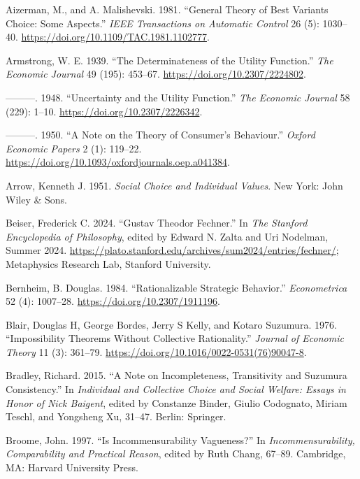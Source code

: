\documentclass[
  10.5pt,
  twoside]{article}
\newlength{\cslhangindent}
\newenvironment{CSLReferences}[2] %
 {\begin{list}{}{%
  \setlength{\itemindent}{0pt}
  \setlength{\leftmargin}{0pt}
  \setlength{\parsep}{0pt}
  \ifodd #1
   \setlength{\leftmargin}{\cslhangindent}
   \setlength{\itemindent}{-1\cslhangindent}
  \fi
  \setlength{\itemsep}{#2\baselineskip}}}
 {\end{list}}
\begin{document}
\label{refs}
\begin{CSLReferences}{1}{0}
Aizerman, M., and A. Malishevski. 1981. {``General Theory of Best
Variants Choice: Some Aspects.''} \emph{IEEE Transactions on Automatic
Control} 26 (5): 1030--40.
\url{https://doi.org/10.1109/TAC.1981.1102777}.

Armstrong, W. E. 1939. {``The Determinateness of the Utility
Function.''} \emph{The Economic Journal} 49 (195): 453--67.
\url{https://doi.org/10.2307/2224802}.

---------. 1948. {``Uncertainty and the Utility Function.''} \emph{The
Economic Journal} 58 (229): 1--10.
\url{https://doi.org/10.2307/2226342}.

---------. 1950. {``A Note on the Theory of Consumer's Behaviour.''}
\emph{Oxford Economic Papers} 2 (1): 119--22.
\url{https://doi.org/10.1093/oxfordjournals.oep.a041384}.

Arrow, Kenneth J. 1951. \emph{Social Choice and Individual Values}. New
York: John Wiley \& Sons.

Beiser, Frederick C. 2024. {``{Gustav Theodor Fechner}.''} In \emph{The
{Stanford} Encyclopedia of Philosophy}, edited by Edward N. Zalta and
Uri Nodelman, {S}ummer 2024.
\url{https://plato.stanford.edu/archives/sum2024/entries/fechner/};
Metaphysics Research Lab, Stanford University.

Bernheim, B. Douglas. 1984. {``Rationalizable Strategic Behavior.''}
\emph{Econometrica} 52 (4): 1007--28.
\url{https://doi.org/10.2307/1911196}.

Blair, Douglas H, George Bordes, Jerry S Kelly, and Kotaro Suzumura.
1976. {``Impossibility Theorems Without Collective Rationality.''}
\emph{Journal of Economic Theory} 11 (3): 361--79.
\url{https://doi.org/10.1016/0022-0531(76)90047-8}.

Bradley, Richard. 2015. {``A Note on Incompleteness, Transitivity and
Suzumura Consistency.''} In \emph{Individual and Collective Choice and
Social Welfare: Essays in Honor of Nick Baigent}, edited by Constanze
Binder, Giulio Codognato, Miriam Teschl, and Yongsheng Xu, 31--47.
Berlin: Springer.

Broome, John. 1997. {``Is Incommensurability Vagueness?''} In
\emph{Incommensurability, Comparability and Practical Reason}, edited by
Ruth Chang, 67--89. Cambridge, MA: Harvard University Press.


\end{CSLReferences}
\end{document}
